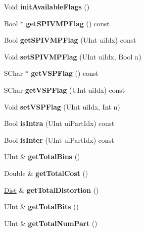 \begin{DoxyCompactItemize}
Void {\bfseries init\+Available\+Flags} ()
\item 
\mbox{\label{class_t_com_data_c_u_a1002c7ddf33488120554fa3021dd4819}} 
Bool $\ast$ {\bfseries get\+S\+P\+I\+V\+M\+P\+Flag} () const
\item 
\mbox{\label{class_t_com_data_c_u_a7970c505888323ed168f7cbf470f9411}} 
Bool {\bfseries get\+S\+P\+I\+V\+M\+P\+Flag} (U\+Int ui\+Idx) const
\item 
\mbox{\label{class_t_com_data_c_u_aee98a3bb4b9930a5f39d53f8de8c2504}} 
Void {\bfseries set\+S\+P\+I\+V\+M\+P\+Flag} (U\+Int ui\+Idx, Bool n)
\item 
\mbox{\label{class_t_com_data_c_u_a06447ae2c6f819964a06d0f9204a24ea}} 
S\+Char $\ast$ {\bfseries get\+V\+S\+P\+Flag} () const
\item 
\mbox{\label{class_t_com_data_c_u_a6252c5ee17931546d735927a8f092fd4}} 
S\+Char {\bfseries get\+V\+S\+P\+Flag} (U\+Int ui\+Idx) const
\item 
\mbox{\label{class_t_com_data_c_u_af855c0bf7457c155780f793d4e8d0a70}} 
Void {\bfseries set\+V\+S\+P\+Flag} (U\+Int ui\+Idx, Int n)
\item 
\mbox{\label{class_t_com_data_c_u_a0e4a18bc3e80142e4efcbc225ed66587}} 
Bool {\bfseries is\+Intra} (U\+Int ui\+Part\+Idx) const
\item 
\mbox{\label{class_t_com_data_c_u_a9833f6e594cf3307fa07468f37c65d86}} 
Bool {\bfseries is\+Inter} (U\+Int ui\+Part\+Idx) const
\item 
\mbox{\label{class_t_com_data_c_u_ae62765454ff4167ee320214c147fcb30}} 
U\+Int \& {\bfseries get\+Total\+Bins} ()
\item 
\mbox{\label{class_t_com_data_c_u_af9c64c7ca00de4cef6f8879276f75d1c}} 
Double \& {\bfseries get\+Total\+Cost} ()
\item 
\mbox{\label{class_t_com_data_c_u_a9eefc7060a854b60deb96dd16cd4c301}} 
\hyperlink{_type_def_8h_a507835e5fb717ea5af4e8b075c8cbede}{Dist} \& {\bfseries get\+Total\+Distortion} ()
\item 
\mbox{\label{class_t_com_data_c_u_a95de2f4656a321a37a78a228616396dd}} 
U\+Int \& {\bfseries get\+Total\+Bits} ()
\item 
\mbox{\label{class_t_com_data_c_u_a6500fa595ae3ba8b0d6276747b6818a9}} 
U\+Int \& {\bfseries get\+Total\+Num\+Part} ()
\end{DoxyCompactItemize}
